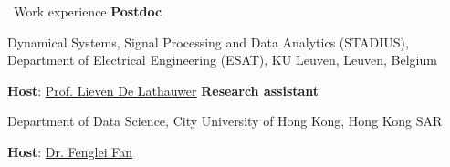 

\begin{rubric}{\faUser\ Work experience}
	\entry*[2026.11 -- 2028.11]%
	\textbf{Postdoc}\par 
	Dynamical Systems, Signal Processing and Data Analytics (STADIUS), Department of Electrical Engineering (ESAT), KU Leuven, Leuven, Belgium
	\par
	\textbf{Host}: \href{https://fengleifan.github.io/Feng-Lei.Fan.github.io/}{Prof. Lieven De Lathauwer}
	\entry*[2026.07 -- 2026.11]%
	\textbf{Research assistant}\par 
	Department of Data Science, City University of Hong Kong, Hong Kong SAR
	\par
	\textbf{Host}: \href{https://fengleifan.github.io/Feng-Lei.Fan.github.io/}{Dr. Fenglei Fan}
\end{rubric}